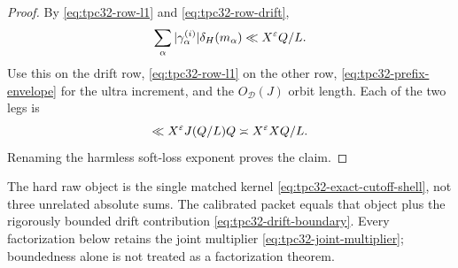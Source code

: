\begin{proof}
By \eqref{eq:tpc32-row-l1} and
\eqref{eq:tpc32-row-drift},
\[
 \sum_\alpha|\gamma_\alpha^{(i)}|\delta_H(m_\alpha)
 \ll X^\varepsilon Q/L.
\]
Use this on the drift row, \eqref{eq:tpc32-row-l1} on the other row,
\eqref{eq:tpc32-prefix-envelope} for the ultra increment, and the
\(O_{\mathscr D}(J)\) orbit length.  Each of the two legs is
\[
 \ll X^\varepsilon J(Q/L)Q
 \asymp X^\varepsilon XQ/L.
\]
Renaming the harmless soft-loss exponent proves the claim.
\end{proof}

\begin{remark}
The hard raw object is the single matched kernel
\eqref{eq:tpc32-exact-cutoff-shell}, not three unrelated absolute
sums.  The calibrated packet equals that object plus the rigorously
bounded drift contribution \eqref{eq:tpc32-drift-boundary}.  Every
factorization below retains the joint multiplier
\eqref{eq:tpc32-joint-multiplier}; boundedness alone is not treated as
a factorization theorem.
\end{remark}
